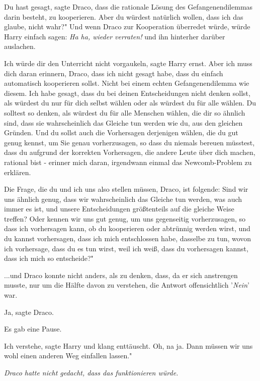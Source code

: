 \glqq Du hast gesagt\grqq{}, sagte Draco, \glqq dass die rationale Lösung des
Gefangenendilemmas darin besteht, zu kooperieren. Aber du würdest natürlich
wollen, dass ich das glaube, nicht wahr?" Und wenn Draco zur Kooperation
überredet würde, würde Harry einfach sagen: \emph{ \glqq Ha ha, wieder
verraten!\grqq{}} und ihn hinterher darüber auslachen.

\glqq Ich würde dir den Unterricht nicht vorgaukeln\grqq{}, sagte Harry ernst.
\glqq Aber ich muss dich daran erinnern, Draco, dass ich nicht gesagt habe, dass
du einfach automatisch kooperieren sollst. Nicht bei einem echten
Gefangenendilemma wie diesem. Ich habe gesagt, dass du bei deinen Entscheidungen
nicht denken sollst, als würdest du nur für dich selbst wählen oder als würdest
du für alle wählen. Du solltest so denken, als würdest du für alle Menschen
wählen, die dir so ähnlich sind, dass sie wahrscheinlich das Gleiche tun werden
wie du, aus den gleichen Gründen. Und du sollst auch die Vorhersagen derjenigen
wählen, die du gut genug kennst, um Sie genau vorherzusagen, so dass du niemals
bereuen müsstest, dass du aufgrund der korrekten Vorhersagen, die andere Leute
über dich machen, rational bist - erinner mich daran, irgendwann einmal das
Newcomb-Problem zu erklären.

Die Frage, die du und ich uns also stellen müssen, Draco, ist folgende: Sind wir
uns ähnlich genug, dass wir wahrscheinlich das Gleiche tun werden, was auch
immer es ist, und unsere Entscheidungen größtenteils auf die gleiche Weise
treffen? Oder kennen wir uns gut genug, um uns gegenseitig vorherzusagen, so
dass ich vorhersagen kann, ob du kooperieren oder abtrünnig werden wirst, und du
kannst vorhersagen, dass ich mich entschlossen habe, dasselbe zu tun, wovon ich
vorhersage, dass du es tun wirst, weil ich weiß, dass du vorhersagen kannst,
dass ich mich so entscheide?"

...und Draco konnte nicht anders, als zu denken, dass, da er sich anstrengen
musste, nur um die Hälfte davon zu verstehen, die Antwort offensichtlich
'\emph{Nein}' war.

\glqq Ja\grqq{}, sagte Draco.

Es gab eine Pause.

\glqq Ich verstehe\grqq{}, sagte Harry und klang enttäuscht. \glqq Oh, na ja.
Dann müssen wir uns wohl einen anderen Weg einfallen lassen."

\emph{ Draco hatte nicht gedacht, dass das funktionieren würde.}


